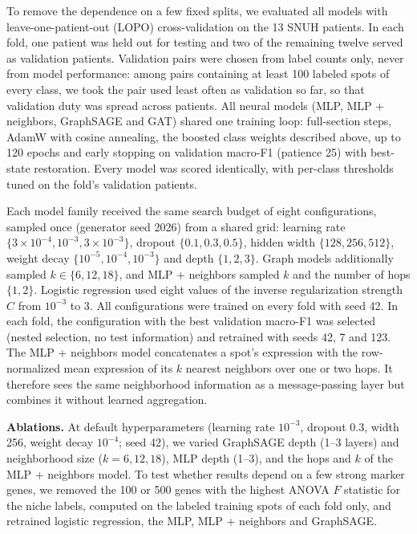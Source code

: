 \documentclass[11pt,letterpaper]{article}
\begin{document}
To remove the dependence on a few fixed splits, we evaluated all models with leave-one-patient-out (LOPO) cross-validation on the 13 SNUH patients. In each fold, one patient was held out for testing and two of the remaining twelve served as validation patients. Validation pairs were chosen from label counts only, never from model performance: among pairs containing at least 100 labeled spots of every class, we took the pair used least often as validation so far, so that validation duty was spread across patients. All neural models (MLP, MLP + neighbors, GraphSAGE and GAT) shared one training loop: full-section steps, AdamW with cosine annealing, the boosted class weights described above, up to 120 epochs and early stopping on validation macro-F1 (patience 25) with best-state restoration. Every model was scored identically, with per-class thresholds tuned on the fold's validation patients.

Each model family received the same search budget of eight configurations, sampled once (generator seed 2026) from a shared grid: learning rate $\{3 \times 10^{-4}, 10^{-3}, 3 \times 10^{-3}\}$, dropout $\{0.1, 0.3, 0.5\}$, hidden width $\{128, 256, 512\}$, weight decay $\{10^{-5}, 10^{-4}, 10^{-3}\}$ and depth $\{1, 2, 3\}$. Graph models additionally sampled $k \in \{6, 12, 18\}$, and MLP + neighbors sampled $k$ and the number of hops $\{1, 2\}$. Logistic regression used eight values of the inverse regularization strength $C$ from $10^{-3}$ to 3. All configurations were trained on every fold with seed 42. In each fold, the configuration with the best validation macro-F1 was selected (nested selection, no test information) and retrained with seeds 42, 7 and 123. The MLP + neighbors model concatenates a spot's expression with the row-normalized mean expression of its $k$ nearest neighbors over one or two hops. It therefore sees the same neighborhood information as a message-passing layer but combines it without learned aggregation.

\textbf{Ablations.} At default hyperparameters (learning rate $10^{-3}$, dropout 0.3, width 256, weight decay $10^{-4}$; seed 42), we varied GraphSAGE depth (1--3 layers) and neighborhood size ($k = 6, 12, 18$), MLP depth (1--3), and the hops and $k$ of the MLP + neighbors model. To test whether results depend on a few strong marker genes, we removed the 100 or 500 genes with the highest ANOVA $F$ statistic for the niche labels, computed on the labeled training spots of each fold only, and retrained logistic regression, the MLP, MLP + neighbors and GraphSAGE.
\end{document}
